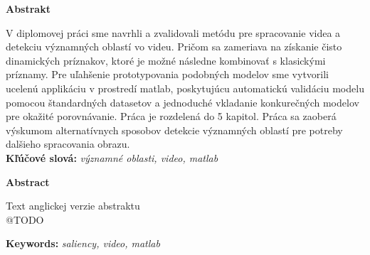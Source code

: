 {\noindent\large\bf Abstrakt}

\vspace{1.8cm}
V diplomovej práci sme navrhli a zvalidovali metódu pre spracovanie videa a detekciu významných oblastí vo videu.
Pričom sa zameriava na získanie čisto dinamických príznakov, ktoré je možné následne kombinovať s klasickými príznamy.
Pre uľahšenie prototypovania podobných modelov sme vytvorili ucelenú applikáciu v prostredí matlab, poskytujúcu automatickú validáciu modelu pomocou štandardných datasetov a jednoduché vkladanie konkurečných modelov pre okažité porovnávanie. Práca je rozdelená do 5 kapitol. Práca sa zaoberá výskumom alternatívnych sposobov detekcie významných oblastí pre potreby dalšieho spracovania obrazu.
\\

{\parindent0pt \textbf{Kľúčové slová:} \emph{významné oblasti, video, matlab}}

\newpage
 {\noindent\large\bf Abstract}
  \vspace{1.8cm}


Text anglickej verzie abstraktu
\\
@TODO

{\parindent0pt \textbf{Keywords:} \emph{saliency, video, matlab}}


\newpage
